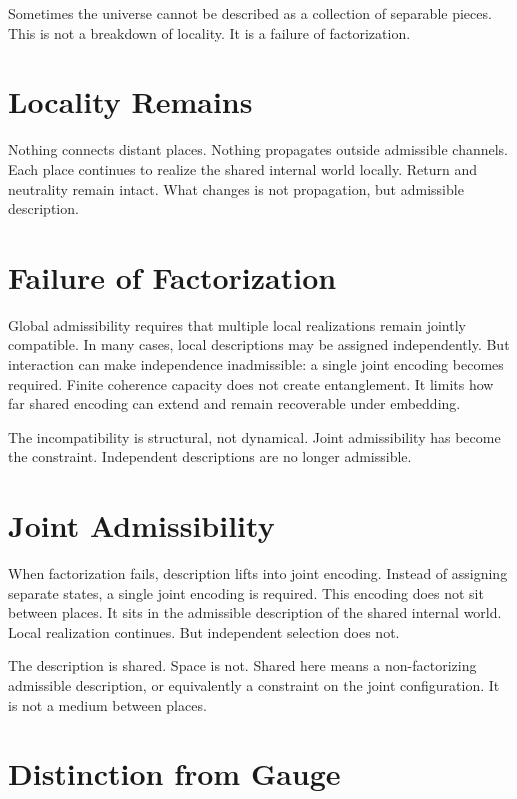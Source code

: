\documentclass[11pt,twoside,openright]{book}
\begin{document}
Sometimes the universe cannot be described as a collection of separable pieces. This is not a breakdown of locality. It is a failure of factorization.

\section*{Locality Remains}

Nothing connects distant places. Nothing propagates outside admissible channels. Each place continues to realize the shared internal world locally. Return and neutrality remain intact. What changes is not propagation, but admissible description.

\section*{Failure of Factorization}

Global admissibility requires that multiple local realizations remain jointly compatible. In many cases, local descriptions may be assigned independently. But interaction can make independence inadmissible: a single joint encoding becomes required. Finite coherence capacity does not create entanglement. It limits how far shared encoding can extend and remain recoverable under embedding.

The incompatibility is structural, not dynamical. Joint admissibility has become the constraint. Independent descriptions are no longer admissible.

\section*{Joint Admissibility}

When factorization fails, description lifts into joint encoding. Instead of assigning separate states, a single joint encoding is required. This encoding does not sit between places. It sits in the admissible description of the shared internal world. Local realization continues. But independent selection does not.

The description is shared. Space is not. Shared here means a non-factorizing admissible description, or equivalently a constraint on the joint configuration. It is not a medium between places.

\section*{Distinction from Gauge}
\end{document}
